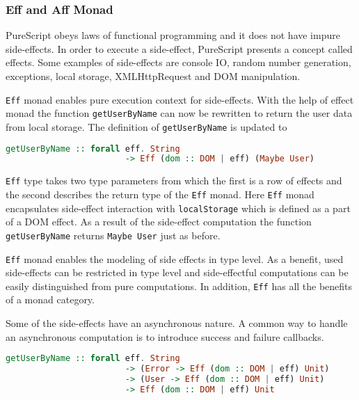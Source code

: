 \documentclass[article]{aaltoseries}
\begin{document}

    \subsubsection{Eff and Aff Monad}
      PureScript obeys laws of functional programming and it does not have
      impure side-effects. In order to execute a side-effect, PureScript
      presents a concept called effects. Some examples of side-effects are
      console IO, random number generation, exceptions, local storage,
      XMLHttpRequest and DOM manipulation.

      \lstinline|Eff| monad enables pure execution context for side-effects.
      With the help of effect monad the function \lstinline|getUserByName| can now
      be rewritten to return the user data from local storage. The definition of
      \lstinline|getUserByName| is updated to

      \begin{lstlisting}[language=Haskell]
        getUserByName :: forall eff. String 
                        -> Eff (dom :: DOM | eff) (Maybe User)
      \end{lstlisting}
 
      \lstinline|Eff| type takes two type parameters from which the first is a
      row of effects and the second describes the return type of the
      \lstinline|Eff| monad. Here \lstinline|Eff| monad encapsulates side-effect
      interaction with \lstinline|localStorage| which is defined as a part of
      a DOM effect. As a result of the side-effect computation the function
      \lstinline|getUserByName| returns \lstinline|Maybe User| just as before.
 
      \lstinline|Eff| monad enables the modeling of side effects in type level.
      As a benefit, used side-effects can be restricted in type level and
      side-effectful computations can be easily distinguished from pure
      computations. In addition, \lstinline|Eff| has all the benefits of a monad
      category.
 
      Some of the side-effects have an asynchronous nature. A common way to handle
      an asynchronous computation is to introduce success and failure callbacks.
 
      \begin{lstlisting}[language=Haskell]
        getUserByName :: forall eff. String 
                        -> (Error -> Eff (dom :: DOM | eff) Unit) 
                        -> (User -> Eff (dom :: DOM | eff) Unit)
                        -> Eff (dom :: DOM | eff) Unit
      \end{lstlisting}
 
\end{document}
